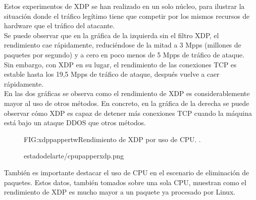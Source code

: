 Estos experimentos de XDP \cite{xdppapper} se han realizado en un solo núcleo, para ilustrar la situación donde el tráfico legítimo tiene que competir por los mismos recursos de hardware que el tráfico del atacante.
\\Se puede observar que en la gráfica de la izquierda sin el filtro XDP, el rendimiento cae rápidamente, reduciéndose de la mitad a 3 Mpps (millones de paquetes por segundo) y a cero en poco menos de 5 Mpps de tráfico de ataque. Sin embargo, con XDP en su lugar, el rendimiento de las conexiones TCP es estable hasta los 19,5 Mpps de tráfico de ataque, después vuelve a caer rápidamente.
\\En las dos gráficas se observa como el rendimiento de XDP es considerablemente mayor al uso de otros métodos. En concreto, en la gráfica de la derecha se puede observar cómo XDP es capaz de detener más conexiones TCP cuando la máquina está bajo un ataque DDOS que otros métodos.

\begin{figure}[Rendimiento de XDP por uso de CPU.]{FIG:xdppappertw}{Rendimiento de XDP por uso de CPU. \cite{xdppapper}.}
  \begin{image}{}{}{estadodelarte/cpupapperxdp.png}
  \end{image}
\end{figure}
\break
También es importante destacar el uso de CPU en el escenario de eliminación de paquetes. Estos datos, también tomados sobre una sola CPU, muestran como el rendimiento de XDP es mucho mayor a un paquete ya procesado por Linux.